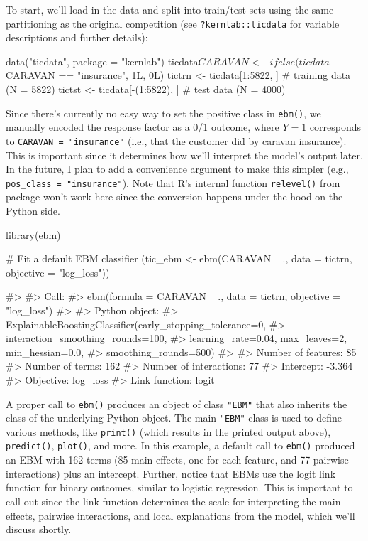 To start, we'll load in the data and split into train/test sets using
the same partitioning as the original competition (see
\texttt{?kernlab::ticdata} for variable descriptions and further
details):

\begin{Schunk}
\begin{Sinput}
data("ticdata", package = "kernlab")
ticdata$CARAVAN <- ifelse(ticdata$CARAVAN == "insurance", 1L, 0L)
tictrn <- ticdata[1:5822, ]     # training data (N = 5822)
tictst <- ticdata[-(1:5822), ]  # test data (N = 4000)
\end{Sinput}
\end{Schunk}

Since there's currently no easy way to set the positive class in
\texttt{ebm()}, we manually encoded the response factor as a 0/1
outcome, where \(Y = 1\) corresponds to \texttt{CARAVAN\ =\ "insurance"}
(i.e., that the customer did by caravan insurance). This is important
since it determines how we'll interpret the model's output later. In the
future, I plan to add a convenience argument to make this simpler (e.g.,
\texttt{pos\_class\ =\ "insurance"}). Note that R's internal function
\texttt{relevel()} from package  won't work here since the
conversion happens under the hood on the Python side.

\begin{Schunk}
\begin{Sinput}
library(ebm)

# Fit a default EBM classifier
(tic_ebm <- ebm(CARAVAN ~ ., data = tictrn, objective = "log_loss"))
\end{Sinput}
\begin{Soutput}
#> 
#> Call:
#> ebm(formula = CARAVAN ~ ., data = tictrn, objective = "log_loss")
#> 
#> Python object:
#> ExplainableBoostingClassifier(early_stopping_tolerance=0,
#>                               interaction_smoothing_rounds=100,
#>                               learning_rate=0.04, max_leaves=2, min_hessian=0.0,
#>                               smoothing_rounds=500)
#> 
#> Number of features: 85 
#> Number of terms: 162 
#> Number of interactions: 77 
#> Intercept: -3.364 
#> Objective: log_loss 
#> Link function: logit
\end{Soutput}
\end{Schunk}

A proper call to \texttt{ebm()} produces an object of class
\texttt{"EBM"} that also inherits the class of the underlying Python
object. The main \texttt{"EBM"} class is used to define various methods,
like \texttt{print()} (which results in the printed output above),
\texttt{predict()}, \texttt{plot()}, and more. In this example, a
default call to \texttt{ebm()} produced an EBM with 162 terms (85 main
effects, one for each feature, and 77 pairwise interactions) plus an
intercept. Further, notice that EBMs use the logit link function for
binary outcomes, similar to logistic regression. This is important to
call out since the link function determines the scale for interpreting
the main effects, pairwise interactions, and local explanations from the
model, which we'll discuss shortly.

